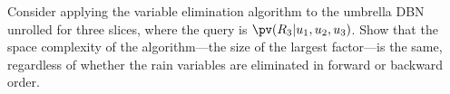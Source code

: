\begin{exercise}
Consider applying the variable elimination algorithm to the umbrella
DBN unrolled for three slices, where the query is
\(\pv(R_3|u_1,u_2,u_3)\). Show that the space complexity of the
algorithm---the size of the largest factor---is the same, regardless
of whether the rain variables are eliminated in forward or backward
order.
\end{exercise} 



